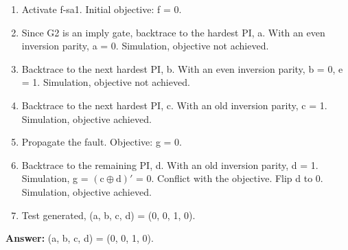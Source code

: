 \begin{enumerate}
  \item Activate f-sa1. Initial objective: f = 0.
  \item Since G2 is an imply gate, backtrace to the hardest PI, a. With an even inversion parity, a = 0. Simulation, objective not achieved.
  \item Backtrace to the next hardest PI, b. With an even inversion parity, b = 0, e = 1. Simulation, objective not achieved.
  \item Backtrace to the next hardest PI, c. With an old inversion parity, c = 1. Simulation, objective achieved.
  \item Propagate the fault. Objective: g = 0.
  \item Backtrace to the remaining PI, d. With an old inversion parity, d = 1. Simulation, g = $(\text{c}\oplus\text{d})'$ = 0. Conflict with the objective. Flip d to 0. Simulation, objective achieved.
  \item Test generated, (a, b, c, d) = (0, 0, 1, 0).

\end{enumerate}

\textbf{Answer:} (a, b, c, d) = (0, 0, 1, 0).


